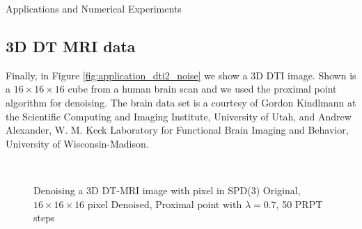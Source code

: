 \begin{chapter}{Applications and Numerical Experiments}
\FloatBarrier
\subsection{3D DT MRI data} %
\label{sub:3DDTMRIdata}

Finally, in Figure \ref{fig:application_dti2_noise} we show a 3D DTI image. Shown is a $16\times 16\times 16$ cube from a human brain scan and we used the proximal point algorithm for denoising. 
The brain data set is a courtesy of Gordon Kindlmann at the Scientific Computing and Imaging Institute, University of Utah, 
and Andrew Alexander, W. M. Keck Laboratory for Functional Brain Imaging and Behavior, University of Wisconsin-Madison. 
\begin{figure}[h!]
    \centering
    \\
    \caption[Denoising 3D DTI-MRI data]{Denoising a 3D DT-MRI image with pixel in SPD(3)
	 Original, $16\times 16\times 16$ pixel 
	 Denoised, Proximal point with $\lambda=0.7$, 50 PRPT steps
	\label{fig:application_dti2}
    }
\end{figure}


\end{chapter}
